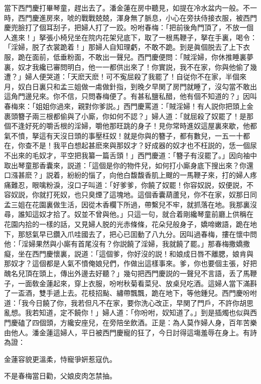 當下西門慶打畢琴童，趕出去了。潘金蓮在房中聽見，如提在冷水盆内一般。不一時，西門慶進房來，唬的戰戰兢兢，渾身無了脈息，小心在旁扶侍接衣服，被西門慶兜臉打了個耳刮子，把婦人打了一跤。吩咐春梅：「把前後角門頂了，不放一個人進來！」拏張小椅兒坐在院内花架兒底下，取了一根馬鞭子，拏在手裏，喝令：「淫婦，脱了衣裳跪着！」那婦人自知理虧，不敢不跪。到是眞個脱去了上下衣服，跪在面前，低垂粉面，不敢出一聲兒。西門慶便問：「賊淫婦，你休推睡裏夢裏，奴才我纔已審問明白，他一一都供出來了！你實説，我不在家，你與他偷了幾遭？」婦人便哭道：「天麽天麽！可不寃屈殺了我罷了！自従你不在家，半個來月，奴白日裏只和孟三姐做一䖏做針指，到晚夕早関了房門就睡了，沒勾當不敢出這角門邊兒來。你不信，只問春梅便了。有甚私鹽私醋，他有個不知道的？」因叫春梅來：「姐姐你過來，親對你爹説。」西門慶罵道：「賊淫婦！有人説你把頭上金裹頭簪子兩三根都偷與了小廝，你如何不認？」婦人道：「就屈殺了奴罷了！是那個不逢好死的嚼舌根的淫婦，嚼他那旺跳的身子！見你常時進奴這屋裏來歇，他都氣不憤，拏這有天沒日頭的事壓枉奴！就是你與的簪子，都有數兒，一五一十都在，你查不是！我平白想起甚麽來與那奴才？好成器的奴才也不枉説的，恁一個尿不出來的毛奴才，平空把我纂一篇舌頭！」西門慶道：「簪子有沒罷了。」因向袖中取出琴童那香囊來，説道：「這個是你的物件兒，如何打小廝身底下搜出來？你還口漒甚麽？」説着，紛紛的惱了，向他白馥馥香肌上颼的一馬鞭子來，打的婦人疼痛難忍，眼噙粉淚，沒口子叫道：「好爹爹，你饒了奴罷！你容奴説，奴便説，不容奴説，你就打死奴，也只臭煙了這塊地。這個香囊葫蘆兒，你不在家，奴那日同孟三姐在花園裏做生活，因從木香欄下所過，帶繫兒不牢，就抓落在地。我那裏沒尋，誰知這奴才拾了。奴並不曾與他。」只這一句，就合着剛纔琴童前廳上供稱在花園内拾的一樣的話，又見婦人脱的光赤條條，花朵兒般身子，嬌啼嫩語，跪在地下，那怒氣早已鑽入爪哇國去了，把心已囬動了八九分。因叫過春梅，摟在懷中問他：「淫婦果然與小廝有首尾沒有？你説饒了淫婦，我就饒了罷。」那春梅撒嬌撒癡，坐在西門慶懷裏，説道：「這個爹，你好沒的説！和娘成日唇不離腮，娘肯與那奴才？這個都是人氣不憤俺娘兒們，作做出這樣事來。爹，你也要個主張，好把醜名兒頂在頭上，傳出外邊去好聽？」幾句把西門慶説的一聲兒不言語，丢了馬鞭子，一面敎金蓮起來，穿上衣服，吩咐秋菊看菜兒、放桌兒吃酒。這婦人當下滿斟了一盃酒，雙手遞上去。花枝招颭、繡帶飄飄，跪在地下，等他鍾兒。西門慶吩咐道：「我今日饒了你，我若但凡不在家，要你洗心改正，早関了門戶，不許你胡思亂想。我若知道，定不饒你！」婦人道：「你吩咐，奴知道了。」到是插燭也似與西門慶磕了四個頭，方纔安座兒，在旁陪坐飲酒。正是：為人莫作婦人身，百年苦樂由他人。潘金蓮這婦人，平日被西門慶寵的狂了，今日討得這塲羞辱在身上。有詩為證：

\begin{myquote}
金蓮容貌更溫柔，恃寵爭姸惹寇仇。

不是春梅當日勸，父娘皮肉怎禁抽。
\end{myquote}

